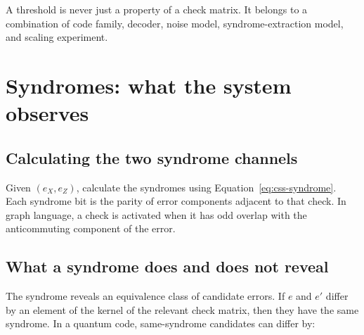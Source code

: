 \documentclass[11pt,letterpaper]{article}
\begin{document}
\begin{warningbox}
A threshold is never just a property of a check matrix. It belongs to a combination of code family,
decoder, noise model, syndrome-extraction model, and scaling experiment.
\end{warningbox}

\section{Syndromes: what the system observes}

\subsection{Calculating the two syndrome channels}

Given $(e_X,e_Z)$, calculate the syndromes using Equation~\eqref{eq:css-syndrome}. Each syndrome bit
is the parity of error components adjacent to that check. In graph language, a check is activated
when it has odd overlap with the anticommuting component of the error.

\begin{center}
\end{center}

\subsection{What a syndrome does and does not reveal}

The syndrome reveals an equivalence class of candidate errors. If $e$ and $e'$ differ by an element
of the kernel of the relevant check matrix, then they have the same syndrome. In a quantum code,
same-syndrome candidates can differ by:
\end{document}
